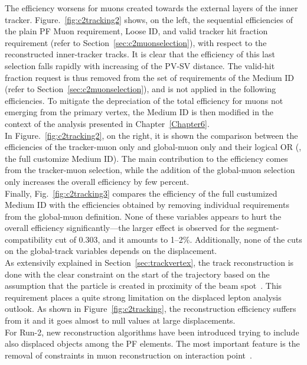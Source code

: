 The efficiency worsens for muons created towards the external layers of the inner
tracker.
Figure.~\ref{fig:c2tracking2} shows, on the left, the sequential
efficiencies of the plain PF Muon requirement,
Loose ID, and
valid tracker hit fraction requirement (refer to Section~\ref{sec:c2muonselection}), with respect to the reconstructed
inner-tracker tracks. It is clear that the efficiency of
this last selection 
falls rapidly with increasing of the PV-SV
distance. 
The valid-hit fraction request is thus removed from the set of
requirements of the Medium ID (refer to Section~\ref{sec:c2muonselection}), and is not applied in the following
efficiencies. To mitigate the depreciation of the
total efficiency for muons not emerging from the primary vertex, the
Medium ID is then modified in the context of the analysis presented in
Chapter~\ref{Chapter6}.\\
In Figure.~\ref{fig:c2tracking2}, on the
right, it is shown
the comparison between the efficiencies of the
tracker-muon only and global-muon only and their logical OR (\ie, the full
customize Medium ID). The main contribution to the efficiency comes
from the tracker-muon selection, while the addition of the global-muon
selection only increases the overall efficiency by few percent.\\
Finally, Fig.~\ref{fig:c2tracking3} compares the efficiency of
the full custumized Medium ID with the efficiencies obtained by removing
individual requirements from the global-muon definition. None of these variables
appears to hurt the overall efficiency significantly---the larger
effect is observed for the segment-compatibility cut of 0.303, and it
amounts to 1--2\%. Additionally, none of the cuts on the global-track
variables depends on the displacement.\\

As extensivily explained in Section~\ref{sec:trackvertex}, the track
reconstruction is done with the clear 
constraint on the start of the trajectory based on the assumption that the
particle is created in proximity of the beam
spot~\cite{Collaboration_2014_tracking}. This requirement places a
quite strong limitation on the displaced lepton analysis outlook. As
shown in Figure~\ref{fig:c2tracking}, the reconstruction efficiency
suffers from it and it goes almost to null values at large
displacements. \\
For Run-2, new reconstruction algorithms have been
introduced trying to include also displaced objects among
the PF elements. The most important feature is the removal of constraints in muon reconstruction
on interaction point~\cite{CMS-DP-2015-015, steven_slide}.

